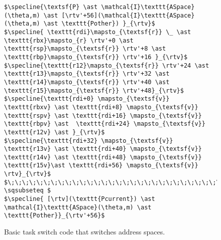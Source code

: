 \begin{figure}
\begin{lstlisting}[mathescape]
$\specline{\textsf{P} \ast \mathcal{I}\texttt{ASpace}(\theta,m) \ast [\rtv'+56](\mathcal{I}\texttt{ASpace}(\theta,m) \ast \texttt{Pother}) }_{\rtv}$
$\specline{ \texttt{rdi}\mapsto_{\textsf{r}} \_ \ast \texttt{rbx}\mapsto_{r} \rtv'+0 \ast  \texttt{rsp}\mapsto_{\textsf{r}} \rtv'+8 \ast \texttt{rbp}\mapsto_{\textsf{r}} \rtv'+16 }_{\rtv}$
$\specline{\texttt{r12}\mapsto_{\textsf{r}} \rtv'+24 \ast \texttt{r13}\mapsto_{\textsf{r}} \rtv'+32 \ast \texttt{r14}\mapsto_{\textsf{r}} \rtv'+40 \ast \texttt{r15}\mapsto_{\textsf{r}} \rtv'+48}_{\rtv}$
$\specline{\texttt{rdi+0} \mapsto_{\textsf{v}} \texttt{rbxv} \ast \texttt{rdi+8} \mapsto_{\textsf{v}} \texttt{rspv} \ast \texttt{rdi+16} \mapsto_{\textsf{v}} \texttt{rbpv} \ast  \texttt{rdi+24} \mapsto_{\textsf{v}} \texttt{r12v} \ast }_{\rtv}$
$\specline{\texttt{rdi+32} \mapsto_{\textsf{v}} \texttt{r13v} \ast \texttt{rdi+40} \mapsto_{\textsf{v}} \texttt{r14v} \ast \texttt{rdi+48} \mapsto_{\textsf{v}} \texttt{r15v}\ast \texttt{rdi+56} \mapsto_{\textsf{v}} \rtv}_{\rtv}$
$\;\;\;\;\;\;\;\;\;\;\;\;\;\;\;\;\;\;\;\;\;\;\;\;\;\;\;\;\;\;\;\;\;\;\;\;\;\;\;\;\;\;\;\; \sqsubseteq $
$\specline{ [\rtv](\texttt{Pcurrent}) \ast \mathcal{I}\texttt{ASpace}(\theta,m) \ast \texttt{Pother}}_{\rtv'+56}$
\end{lstlisting}
\caption{Basic task switch code that switches address spaces.}
\label{fig:swtch}
\end{figure}

